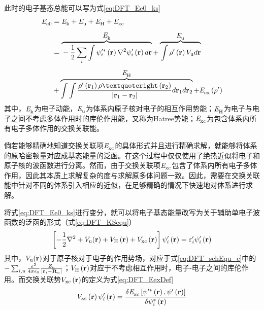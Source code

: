 此时的电子基态总能可以写为式\eqref{eq:DFT_Ee0_ks}\chinesecolon
\begin{equation}
    \label{eq:DFT_Ee0_ks}
    \begin{split}
        \energyVar{e0}{}&=\energyVar{k}{}+\energyVar{u}{}+\energyVar{H}{}+\energyVar{xc}{}\\[+1ex]
        &=\overbrace{\rule[0ex]{0ex}{3.2ex}-\frac{1}{2}\sum_i\int\psi'^*_i\left({\bm r}\right)\nabla^2\psi'_i\left({\bm r}\right)d{\bm r}}^{\mbox{\normalsize $\energyVar{k}{}$}} + \overbrace{\rule[0ex]{0ex}{3.2ex}\int\rho'\left({\bm r}\right)V_{\rm u}d{\bm r}}^{\mbox{\normalsize $\energyVar{u}{}$}}\\[+1ex]
        &+\overbrace{\int\int \frac{\rho'\left({\bm r}_1\right)\rho’\left({\bm r}_2\right)}{\left\lvert{\bm r}_1 - {\bm r}_2\right\rvert}d{\bm r}_1d{\bm r}_2}^{\mbox{\normalsize $\energyVar{H}{}$}}+\energyVar{ex}{}\left(\rho'\right)
    \end{split}
\end{equation}
其中，$\it E_{\rm k}^{\rm } \it$为电子动能，$\it E_{\rm u}^{\rm } \it$为体系内原子核对电子的相互作用势能；$\it E_{\rm H}^{\rm } \it$为电子与电子之间不考虑多体作用时的库伦作用能，又称为Hatree势能；$\it E_{\rm xc}^{\rm } \it$为包含体系内所有电子多体作用的交换关联能。

倘若能够精确地知道交换关联项$\it E_{\rm xc}^{\rm } \it$的具体形式并且进行精确求解，就能够将体系的原哈密顿量对应成基态能量的泛函。在这个过程中仅仅使用了绝热近似将电子和原子核的波函数进行分离。然而，由于交换关联项$\it E_{\rm xc}^{\rm } \it$包含了体系内所有电子多体作用，因此其本质上求解复杂的度与求解原多体问题一致。因此，需要在交换关联能中针对不同的体系引入相应的近似，在足够精确的情况下快速地对体系进行求解。

将式\eqref{eq:DFT_Ee0_ks}进行变分，就可以将电子基态能量改写为关于辅助单电子波函数的泛函的形式（式\eqref{eq:DFT_KSequ}）\chinesecolon
\begin{equation}
    \label{eq:DFT_KSequ}
    \left[-\frac{1}{2}\nabla^2+V_{\rm u}({\mathbf r})+V_{\rm H}\left({\mathbf r}\right)+V_{\rm xc}\left({\mathbf r}\right)\right]\psi'_i\left({\mathbf r}\right)=\varepsilon'_i\psi'_i\left({\mathbf r}\right) 
\end{equation}
其中，$V_{\rm u}({\mathbf r})$对于原子核对于电子的作用势场，对应于式\eqref{eq:DFT_schEqu_e}中的$-\sum_{i,u}\frac{e^2}{4\pi\epsilon_0}\frac{Z_{\rm u}}{\left\lvert{\mathbf r}_i - {\mathbf R}_u\right\rvert}$；$V_{\rm H}\left({\mathbf r}\right)$对应于不考虑相互作用时，电子-电子之间的库伦作用。而交换关联势$V_{\rm xc}\left({\mathbf r}\right)$的定义为式\eqref{eq:DFT_EexDef}\chinesecolon
\begin{equation}
    \label{eq:DFT_EexDef}
    V_{\rm xc}\left({\mathbf r}\right)\psi'_i\left({\mathbf r}\right)=\frac{\delta \it E_{\rm xc}^{\rm } \it\left[\psi'^*\left({\mathbf r}\right),\psi'\left({\mathbf r}\right)\right]}{\delta \psi_i^*\left({\mathbf r}\right)}
\end{equation}

